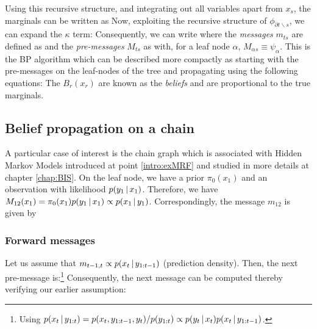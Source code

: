 Using this recursive structure, and integrating out all variables apart from $x_{s}$, the marginals can be written as
Now, exploiting the recursive structure of $\phi_{\partial t\backslash s}$, we can expand the $\kappa$ term:
Consequently, we can write
where the \emph{messages} $m_{ts}$ are defined as
and the \emph{pre-messages} $M_{ts}$ as
with, for a leaf node $\alpha$, $M_{\alpha  s} \equiv \psi_\alpha$. This is the BP algorithm which can be described more compactly as starting with the pre-messages on the leaf-nodes of the tree and propagating using the following equations:
The $B_{r}(x_{r})$ are known as the \emph{beliefs} and are proportional to the true marginals.

\subsection{Belief propagation on a chain}
A particular case of interest is the chain graph which is associated with Hidden Markov Models introduced at point \ref{intro:exMRF} and studied in more details at chapter \ref{chap:BIS}. On the leaf node, we have a prior $\pi_{0}(x_{1})$ and an observation with likelihood $p(y_{1}\,|\, x_{1})$. Therefore, we have $M_{12}(x_{1})=\pi_{0}(x_{1})p(y_{1}\,|\, x_{1})\propto p(x_{1}\,|\, y_{1})$. Correspondingly, the message $m_{12}$ is given by
\subsubsection{Forward messages}
Let us assume that $m_{t-1, t} \propto p(x_{t}\,|\, y_{1:t-1})$ (prediction density). Then, the next pre-message is:\footnote{Using $p(x_{t}\,|\, y_{1:t})= p(x_{t},y_{1:t-1},y_{t})/p(y_{1:t})\propto p(y_{t}\,|\, x_{t})p(x_{t}\,|\, y_{1:t-1})$.}
Consequently, the next message can be computed thereby verifying our earlier assumption:
%
%
